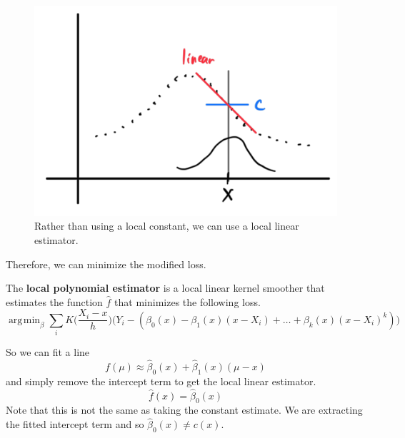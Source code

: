 \documentclass{article}
\DeclareMathOperator*{\argmin}{\arg\!\min}
\begin{document}
    \begin{figure}[H]
      \centering 
      \includegraphics[scale=0.4]{img/local_linear_estimator.png}
      \caption{Rather than using a local constant, we can use a local linear estimator.} 
      \label{fig:local_linear_estimator}
    \end{figure}

    Therefore, we can minimize the modified loss. 

    \begin{definition}
      The \textbf{local polynomial estimator} is a local linear kernel smoother that estimates the function $\hat{f}$ that minimizes the following loss. 
      \begin{equation}
        \argmin_{\beta} \sum_i K \bigg( \frac{X_i - x}{h} \bigg) \big( Y_i - (\beta_0 (x) - \beta_1 (x) (x- X_i) + \ldots + \beta_k (x) (x - X_i)^k )\big)
      \end{equation}
    \end{definition}

    So we can fit a line 
    \begin{equation}
      f(\mu) \approx \hat{\beta}_0 (x) + \hat{\beta}_1 (x) (\mu - x)
    \end{equation}
    and simply remove the intercept term to get the local linear estimator. 
    \begin{equation}
      \hat{f}(x) = \hat{\beta}_0 (x)
    \end{equation}
    Note that this is not the same as taking the constant estimate. We are extracting the fitted intercept term and so $\hat{\beta}_0(x) \neq c(x)$. 
\end{document}
